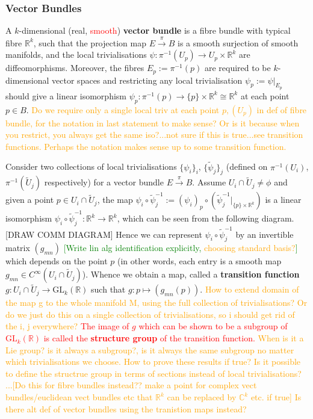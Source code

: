 \documentclass[a4paper]{article}
\theoremstyle{definition} \newtheorem*{definition}{Definition}
\theoremstyle{definition} \newtheorem*{definitions}{Definitions}
\theoremstyle{plain} \newtheorem{theorem}{Theorem}[section]
\theoremstyle{plain} \newtheorem{proposition}[theorem]{Proposition}
\theoremstyle{plain} \newtheorem{corollary}[theorem]{Corollary}
\theoremstyle{plain} \newtheorem{lemma}[theorem]{Lemma}
\theoremstyle{plain} \newtheorem{example}[theorem]{Example}
\newcommand{\checkCorrect}[1]{\textcolor{red}{#1}}
\newcommand{\question}[1]{\textcolor{orange}{#1}}
\newcommand{\finish}[1]{\textcolor{green}{#1}}
\newcommand{\defn}[1]{\textbf{#1}}
\newcommand{\realnos}{\mathbb{R}}
\newcommand{\complexnos}{\mathbb{C}}
\newcommand{\canonicaliso}{\cong}
\begin{document}
\subsubsection{Vector Bundles}
A $k$-dimensional (real, \checkCorrect{smooth}) \defn{vector bundle} is a fibre bundle with typical fibre $\realnos^k$, such that the projection map $E\xrightarrow{\pi} B$ is a smooth surjection of smooth manifolds, and the local trivialisations $\psi:\pi^{-1}(U_p) \rightarrow U_p \times \realnos^k$ are diffeomorphisms. Moreover, the fibres $E_p:=\pi^{-1}(p)$ are required to be $k$-dimensional vector spaces and restricting any local trivialisation $\psi_p:=\psi \vert_{E_p}$ should give a linear isomorphism $\psi_p:\pi^{-1}(p)\rightarrow \{p\} \times \realnos^k \canonicaliso \realnos^k$ at each point $p\in B$. \question{Do we require only a single local triv at each point $p, (U_p)$ in def of fibre bundle, for the notation in last statement to make sense? Or is it because when you restrict, you always get the same iso?...not sure if this is true...see transition functions. Perhaps the notation makes sense up to some transition function.}

Consider two collections of local trivialisations $\{\psi_i \}_i$, $\{\tilde{\psi}_j\}_j$ (defined on $\pi^{-1}(U_i)$, $\pi^{-1}(\tilde{U}_j)$ respectively) 
for a vector bundle $E\xrightarrow{\pi} B$. Assume $U_i \cap \tilde{U}_j\neq \phi$ and given a 
point $p\in U_i \cap \tilde{U}_j$, the map $\psi_i \circ \tilde{\psi}_j^{-1}:=(\psi_i)_p \circ (\tilde{\psi}_j^{-1}\vert_{\{p\}\times \realnos^k})$ 
is a linear isomorphism $\psi_i \circ \tilde{\psi}_j^{-1} : \realnos^k \rightarrow \realnos^k$, 
which can be seen from the following diagram.
[DRAW COMM DIAGRAM]
Hence we can represent $\psi_i \circ \tilde{\psi}_j^{-1}$ by an invertible matrix $(g_{mn})$ \finish{[Write lin alg identification explicitly, \question{choosing standard basis?}]} which depends on the point $p$ (in other words, each entry is a smooth map $g_{mn}\in C^\infty(U_i\cap \tilde{U}_j)$). Whence we obtain a map, called a \defn{transition function}
$g:U_i\cap \tilde{U}_j\rightarrow \mathrm{GL}_k(\realnos)$ such that $g:p\mapsto (g_{mn}(p))$. \question{How to extend domain of the map g to the whole manifold M, using the full collection of trivialisations? Or do we just do this on a single collection of trivialisations, so i should get rid of the i, j everywhere?} \checkCorrect{The image of $g$ which can be shown to be a subgroup of $\mathrm{GL}_k(\realnos)$ is called the \defn{structure group} of the transition function.} \question{When is it a Lie group? is it always a subgroup?, is it always the same subgroup no matter which trivialisations we choose. How to prove these results if true?} \question{Is it possible to define the structrue group in terms of sections instead of local trivialisations?}
\question{...[Do this for fibre bundles instead?? make a point for complex vect bundles/euclidean vect bundles etc that $\realnos^k$ can be replaced by $\complexnos^k$ etc. if true]}
\question{Is there alt def of vector bundles using the tranistion maps instead?}
\end{document}
